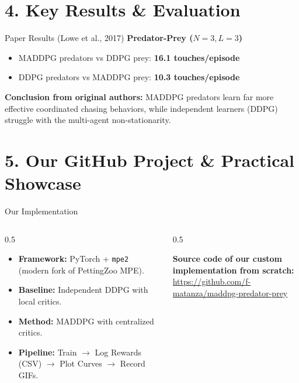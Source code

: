 \documentclass[aspectratio=169]{beamer}
\begin{document}
\section{4. Key Results \& Evaluation}

\begin{frame}{Paper Results (Lowe et al., 2017)}
    \textbf{Predator-Prey ($N=3, L=3$)}
    \begin{itemize}
        \item MADDPG predators vs DDPG prey: \textbf{16.1 touches/episode}
        \item DDPG predators vs MADDPG prey: \textbf{10.3 touches/episode}
    \end{itemize}
    \vspace{0.5cm}
    \textbf{Conclusion from original authors:}
    MADDPG predators learn far more effective coordinated chasing behaviors, while independent learners (DDPG) struggle with the multi-agent non-stationarity.
\end{frame}

\section{5. Our GitHub Project \& Practical Showcase}

\begin{frame}{Our Implementation}
    \begin{columns}
        \begin{column}{0.5\textwidth}
            \begin{itemize}
                \item \textbf{Framework:} PyTorch + \texttt{mpe2} (modern fork of PettingZoo MPE).
                \item \textbf{Baseline:} Independent DDPG with local critics.
                \item \textbf{Method:} MADDPG with centralized critics.
                \item \textbf{Pipeline:} Train $\rightarrow$ Log Rewards (CSV) $\rightarrow$ Plot Curves $\rightarrow$ Record GIFs.
            \end{itemize}
        \end{column}
        \begin{column}{0.5\textwidth}
            \begin{center}
                \textbf{Source code of our custom implementation from scratch:}\\
                \url{https://github.com/f-matanza/maddpg-predator-prey}
            \end{center}
        \end{column}
    \end{columns}
\end{frame}
\end{document}
